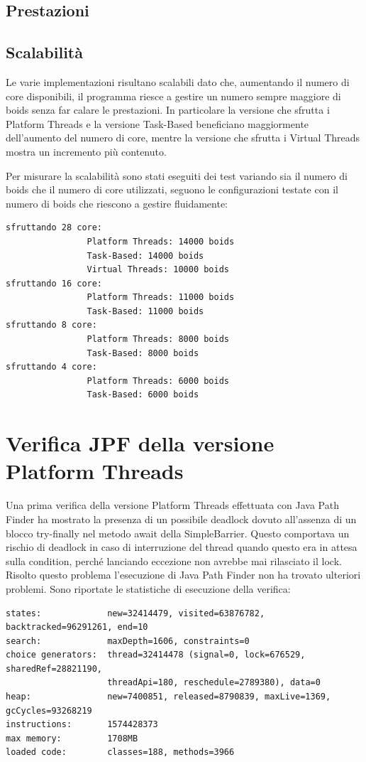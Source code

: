 \documentclass[11pt,notitlepage]{article}
\begin{document}
\subsection{Prestazioni}

\subsection{Scalabilità}
Le varie implementazioni risultano scalabili dato che, aumentando il numero di core disponibili, il programma riesce a gestire un numero sempre maggiore di boids senza far calare le prestazioni.
In particolare la versione che sfrutta i Platform Threads e la versione Task-Based beneficiano maggiormente dell'aumento del numero di core, mentre la versione che sfrutta i Virtual Threads mostra un incremento più contenuto.

Per misurare la scalabilità sono stati eseguiti dei test variando sia il numero di boids che il numero di core utilizzati, seguono le configurazioni testate con il numero di boids che riescono a gestire fluidamente:
\begin{verbatim}
sfruttando 28 core:
                Platform Threads: 14000 boids
                Task-Based: 14000 boids
                Virtual Threads: 10000 boids
sfruttando 16 core:
                Platform Threads: 11000 boids 
                Task-Based: 11000 boids
sfruttando 8 core:
                Platform Threads: 8000 boids 
                Task-Based: 8000 boids
sfruttando 4 core:
                Platform Threads: 6000 boids 
                Task-Based: 6000 boids
\end{verbatim}


\section{Verifica JPF della versione Platform Threads}
Una prima verifica della versione Platform Threads effettuata con Java Path Finder ha mostrato la presenza di un possibile deadlock dovuto all'assenza di un blocco try-finally
nel metodo \textsf{await} della \textsf{SimpleBarrier}. Questo comportava un rischio di deadlock in caso di interruzione del thread quando questo era in attesa sulla condition, perché 
lanciando eccezione non avrebbe mai rilasciato il lock.
Risolto questo problema l'esecuzione di Java Path Finder non ha trovato ulteriori problemi.
Sono riportate le statistiche di esecuzione della verifica:
\begin{verbatim}
states:             new=32414479, visited=63876782, backtracked=96291261, end=10
search:             maxDepth=1606, constraints=0
choice generators:  thread=32414478 (signal=0, lock=676529, sharedRef=28821190, 
                    threadApi=180, reschedule=2789380), data=0
heap:               new=7400851, released=8790839, maxLive=1369, gcCycles=93268219
instructions:       1574428373
max memory:         1708MB
loaded code:        classes=188, methods=3966
\end{verbatim}
\end{document}
